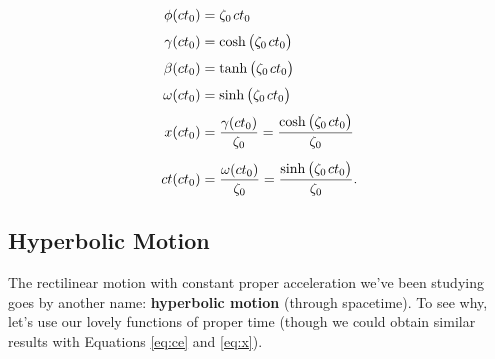 \documentclass[12pt]{article}
\begin{document}
\begin{equation*}
\begin{aligned}
\phi (ct_0) &= \zeta_0 \mkern2mu ct_0 \\[3pt]
\gamma (ct_0) &= \cosh \big( \zeta_0 \mkern2mu ct_0 \big) \\[3pt]
\beta (ct_0) &= \tanh \big( \zeta_0 \mkern2mu ct_0 \big) \\[3pt]
\omega (ct_0) &= \sinh \big( \zeta_0 \mkern2mu ct_0 \big) \\[3pt]
x(ct_0) &= \dfrac{\gamma(ct_0)}{ \zeta_0 } = \dfrac{\cosh \big( \zeta_0 \mkern2mu ct_0 \big)}{ \zeta_0 } \\[5pt]
ct(ct_0) &= \dfrac{\omega (ct_0) }{ \zeta_0} = \dfrac{\sinh \big( \zeta_0 \mkern2mu ct_0 \big)}{ \zeta_0 }.
\end{aligned}
\end{equation*}



\subsection{Hyperbolic Motion}

The rectilinear motion with constant proper acceleration we've been studying goes by another name: \textbf{hyperbolic motion} (through spacetime). To see why, let's use our lovely functions of proper time (though we could obtain similar results with Equations \ref{eq:ce} and \ref{eq:x}).
\end{document}
